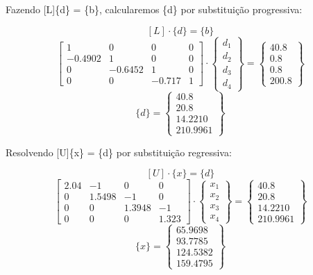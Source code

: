 \documentclass[12pt]{article}
\begin{document}
Fazendo [L]\{d\} = \{b\}, calcularemos \{d\} por substituição progressiva:

\[
[L] \cdot \{d\} = \{b\}
\]
\[
\begin{bmatrix}
    1 & 0 & 0 & 0 \\
    -0.4902 & 1 & 0 & 0 \\
    0 & -0.6452 & 1 & 0 \\
    0 & 0 & -0.717 & 1
  \end{bmatrix}
\cdot
\begin{Bmatrix}
    d_1 \\
    d_2 \\
    d_3 \\
    d_4
  \end{Bmatrix} =
  \begin{Bmatrix}
    40.8 \\
    0.8 \\
    0.8 \\
    200.8
  \end{Bmatrix}
\]
\[
\{d\} = \begin{Bmatrix}
    40.8 \\
    20.8 \\
    14.2210 \\
    210.9961
  \end{Bmatrix}
\]

Resolvendo [U]\{x\} = \{d\} por substituição regressiva:

\[
[U] \cdot \{x\} = \{d\}
\]
\[
\begin{bmatrix}
    2.04 & -1 & 0 & 0 \\
    0 & 1.5498 & -1 & 0\\
    0 & 0 & 1.3948 & -1 \\
    0 & 0 & 0 & 1.323
  \end{bmatrix}
\cdot
\begin{Bmatrix}
    x_1 \\
    x_2 \\
    x_3 \\
    x_4
  \end{Bmatrix} =
  \begin{Bmatrix}
    40.8 \\
    20.8 \\
    14.2210 \\
    210.9961
  \end{Bmatrix}
\]
\[
\{x\} = \begin{Bmatrix}
    65.9698 \\
    93.7785 \\
    124.5382 \\
    159.4795
  \end{Bmatrix}
\]
\end{document}
